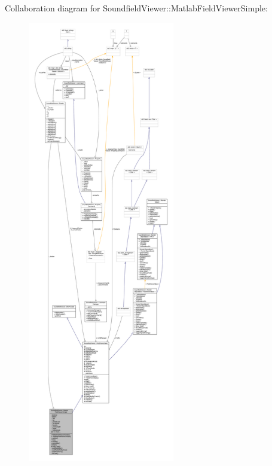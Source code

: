 Collaboration diagram for Soundfield\-Viewer\-:\-:Matlab\-Field\-Viewer\-Simple\-:\nopagebreak
\begin{figure}[H]
\begin{center}
\leavevmode
\includegraphics[height=550pt]{d5/d82/classSoundfieldViewer_1_1MatlabFieldViewerSimple__coll__graph}
\end{center}
\end{figure}
